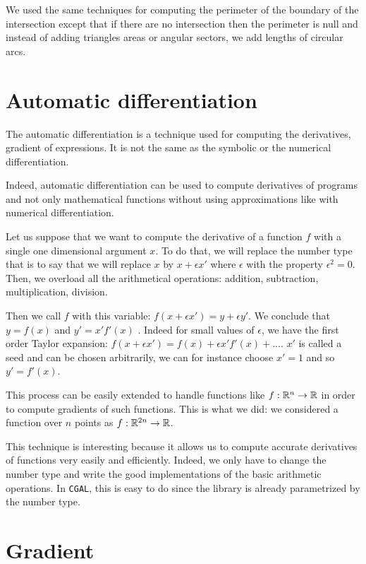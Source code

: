 We used the same techniques for computing the perimeter of the boundary of the
intersection except that if there are no intersection then the perimeter is null
and instead of adding triangles areas or angular sectors, we add lengths of
circular arcs.


\section{Automatic differentiation}

The automatic differentiation is a technique used for computing the derivatives,
gradient of expressions. It is not the same as the symbolic or the numerical
differentiation.

Indeed, automatic differentiation can be used to compute derivatives of programs
and not only mathematical functions without using approximations like with
numerical differentiation.

Let us suppose that we want to compute the derivative of a function $ f $ with a
single one dimensional argument $ x $. To do that, we will replace the number
type that is to say that we will replace $ x $ by $ x + \epsilon x' $ where $
\epsilon $ with the property $ \epsilon^2 = 0 $. Then, we overload all the
arithmetical operations: addition, subtraction, multiplication, division.

Then we call $ f $ with this variable: $ f(x + \epsilon x') = y + \epsilon y'
$. We conclude that $ y = f(x) $ and $ y' = x' f'(x) $ . Indeed for small values
of $ \epsilon $, we have the first order Taylor expansion: $ f(x + \epsilon x') =
f(x) + \epsilon x' f'(x) + ... $. $ x' $ is called a seed and can be chosen
arbitrarily, we can for instance choose $ x ' = 1 $ and so $ y' = f'(x) $.

This process can be easily extended to handle functions like $ f : \mathbb{R}^n
\rightarrow \mathbb{R} $ in order to compute gradients of such functions. This is what
we did: we considered a function over $ n $ points as $ f : \mathbb{R}^{2n} \rightarrow
\mathbb{R} $.

This technique is interesting because it allows us to compute accurate
derivatives of functions very easily and efficiently. Indeed, we only have to
change the number type and write the good implementations of the basic
arithmetic operations.
In \texttt{CGAL}, this is easy to do since the library is already parametrized
by the number type.


\section{Gradient}

